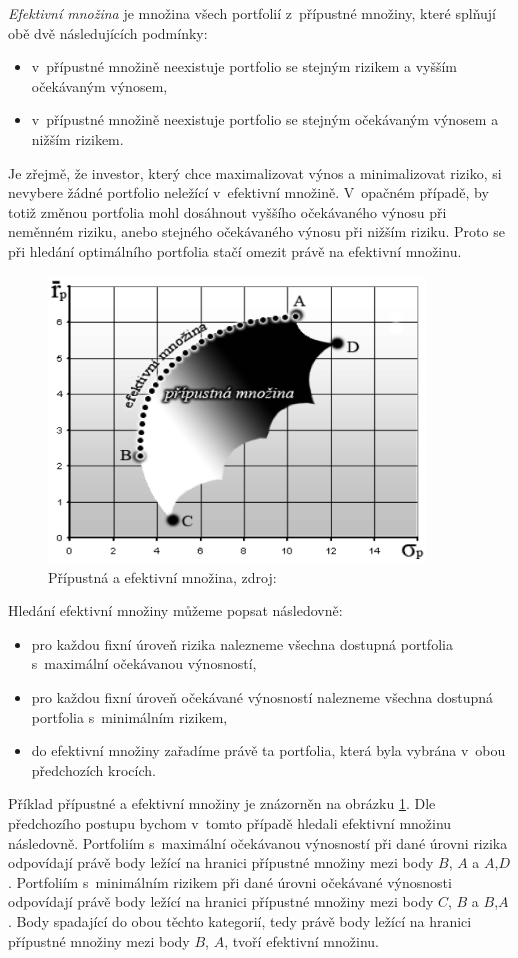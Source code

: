 \documentclass[12pt,a4paper]{report}
\begin{document}
\emph{Efektivní množina} je množina všech portfolií z~přípustné množiny, které splňují obě dvě následujících podmínky:
\begin{itemize}
\item v~přípustné množině neexistuje portfolio se stejným rizikem a vyšším očekávaným výnosem,
\item v~přípustné množině neexistuje portfolio se stejným očekávaným výnosem a nižším rizikem. 
\end{itemize}

Je zřejmě, že investor, který chce maximalizovat výnos a minimalizovat riziko, si nevybere žádné portfolio neležící v~efektivní množině. V~opačném případě, by totiž změnou portfolia mohl dosáhnout vyššího očekávaného výnosu při neměnném riziku, anebo stejného očekávaného výnosu při nižším riziku. Proto se při hledání optimálního portfolia stačí omezit právě na efektivní množinu.

\begin{figure}[htb]
\centering
\includegraphics[width=10cm]{ef_mn.png}
\caption{Přípustná a efektivní množina, zdroj: \cite{camsky} \label{ef_mn}}
\end{figure}

Hledání efektivní množiny můžeme popsat následovně:
\begin{itemize}
\item pro každou fixní úroveň rizika nalezneme všechna dostupná portfolia s~maximální očekávanou výnosností, 
\item pro každou fixní úroveň očekávané výnosností nalezneme všechna dostupná portfolia s~minimálním rizikem,
\item do efektivní množiny zařadíme právě ta portfolia, která byla vybrána v~obou předchozích krocích.
\end{itemize}
Příklad přípustné a efektivní množiny je znázorněn na obrázku \ref{ef_mn}. Dle předchozího postupu bychom v~tomto případě hledali efektivní množinu následovně. Portfoliím s~maximální očekávanou výnosností při dané úrovni rizika odpovídají právě body ležící na hranici přípustné množiny mezi body $B$, $A$ a $A$,$D$. Portfoliím s~minimálním rizikem  při dané úrovni očekávané výnosnosti odpovídají právě body ležící na hranici přípustné množiny mezi body $C$, $B$ a $B$,$A$. Body spadající do obou těchto kategorií, tedy právě body ležící na hranici přípustné množiny mezi body $B$, $A$, tvoří efektivní množinu.
\end{document}
